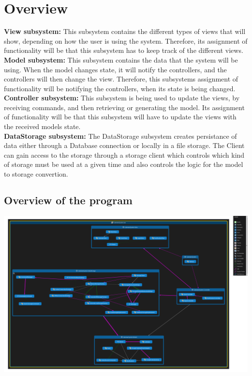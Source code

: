 \section{Overview}
\textbf{View subsystem:}
This subsystem contains the different types of views that will show, depending on how the user is 
using the system. Therefore, its assignment of functionality will be that this subsystem 
has to keep track of the different views.\\
\textbf{Model subsystem:}
This subsystem contains the data that the system will be using. When the model changes state, 
it will notify the controllers, and the controllers will then change the view. Therefore, 
this subsystems assignment of functionality will be notifying the controllers, 
when its state is being changed.\\
\textbf{Controller subsystem:}
This subsystem is being used to update the views, by receiving commands, and then retrieving or generating the model. 
Its assignment of functionality will be that this subsystem will have to update the views 
with the received models state.\\
\textbf{DataStorage subsystem:}
The DataStorage subsystem creates persistance of data either through a Database connection or locally in a file storage. The Client can gain access to the storage through a storage client which controls which kind of storage must be used at a given time and also controls the logic for the model to storage convertion. 

\subsection{Overview of the program}
\includegraphics[scale=0.13]{OverallClassDependencies}\\

